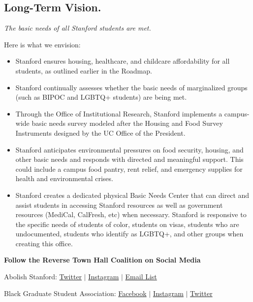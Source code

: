 \documentclass[12pt, titlepage, letterpaper]{article}
\begin{document}
\subsection*{Long-Term Vision.}
%

\textit{The basic needs of all Stanford students are met. }

Here is what we envision:

\begin{itemize}
    \item Stanford ensures housing, healthcare, and childcare affordability for all students, as outlined earlier in the Roadmap.
    \item Stanford continually assesses whether the basic needs of marginalized groups (such as BIPOC and LGBTQ+ students) are being met.
    \item Through the Office of Institutional Research, Stanford implements a campus-wide basic needs survey modeled after the Housing and Food Survey Instruments designed by the UC Office of the President.
    \item Stanford anticipates environmental pressures on food security, housing, and other basic needs and responds with directed and meaningful support. This could include a campus food pantry, rent relief, and emergency supplies for health and environmental crises. 
    \item Stanford creates a dedicated physical Basic Needs Center that can direct and assist students in accessing Stanford resources as well as government resources (MediCal, CalFresh, etc) when necessary. Stanford is responsive to the specific needs of students of color, students on visas, students who are undocumented, students who identify as LGBTQ+, and other groups when creating this office.

\end{itemize}


\newpage 

\vspace*{5.5em}
\begin{center}
\large\textbf{Follow the Reverse Town Hall Coalition on Social Media}
\end{center}
\vspace*{1em}
Abolish Stanford: \href{https://twitter.com/abolishstanford}{Twitter} $\vert$ \href{https://www.instagram.com/abolishstanford/}{Instagram} $\vert$ \href{https://lists.riseup.net/www/subscribe/abolishstanford/}{Email List}

Black Graduate Student Association: \href{https://www.facebook.com/StanfordBGSA}{Facebook} $\vert$ \href{https://www.instagram.com/stanfordbgsa/}{Instagram} $\vert$ \href{https://twitter.com/StanfordBGSA}{Twitter}
\end{document}
